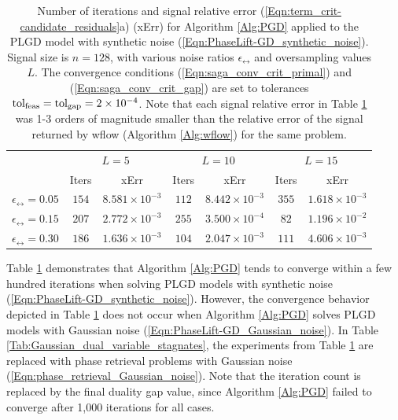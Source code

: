 \begin{table}[H]
\centering
\begin{tabular}{ |c|cc|cc|cc| }
 \hline

 	&	\multicolumn{2}{c|}{$L = 5$}
 		&	\multicolumn{2}{c|}{$L = 10$}
 			&	\multicolumn{2}{c|}{$L = 15$}	\\
 	&	 Iters	&	xErr
 		&	Iters	&	xErr
 			&	Iters	&	xErr		\\  			
 \hline
$\epsilon_\rel = 0.05$
	&	$154$ & $8.581 \times 10^{-3}$
		&	$112$ & $8.442 \times 10^{-3}$
			&	$355$ & $ 1.618 \times 10^{-3}$ \\
$\epsilon_\rel = 0.15$
	&	$207$ & $2.772 \times 10^{-3}$
		&	$255$ & $3.500 \times 10^{-4}$
			&	$82$ & $1.196 \times 10^{-2} $ \\
$\epsilon_\rel = 0.30$
	&	$186$ & $1.636 \times 10^{-3}$
		&	$104$ & $2.047 \times 10^{-3}$
			&	$111$ & $4.606 \times 10^{-3}$ \\
 \hline
\end{tabular}
\caption{Number of iterations and signal relative error (\ref{Eqn:term_crit-candidate_residuals}a) (xErr) for Algorithm \ref{Alg:PGD} applied to the PLGD model with synthetic noise (\ref{Eqn:PhaseLift-GD_synthetic_noise}).  Signal size is $n=128$, with various noise ratios $\epsilon_\rel$ and oversampling values $L$.  The convergence conditions (\ref{Eqn:saga_conv_crit_primal}) and (\ref{Eqn:saga_conv_crit_gap}) are set to tolerances $\textnormal{tol}_\textnormal{feas} = \textnormal{tol}_\textnormal{gap} = 2 \times 10^{-4}$.  Note that each signal relative error in Table \ref{Tab:synthetic_dual_variable_converges} was 1-3 orders of magnitude smaller than the relative error of the signal returned by wflow (Algorithm \ref{Alg:wflow}) for the same problem.} 
\label{Tab:synthetic_dual_variable_converges}
\end{table}


Table \ref{Tab:synthetic_dual_variable_converges} demonstrates that Algorithm \ref{Alg:PGD} tends to converge within a few hundred iterations when solving PLGD models with synthetic noise (\ref{Eqn:PhaseLift-GD_synthetic_noise}).  However, the convergence behavior depicted in Table \ref{Tab:synthetic_dual_variable_converges} does not occur when Algorithm \ref{Alg:PGD} solves PLGD models with Gaussian noise (\ref{Eqn:PhaseLift-GD_Gaussian_noise}).  In Table \ref{Tab:Gaussian_dual_variable_stagnates}, the experiments from Table \ref{Tab:synthetic_dual_variable_converges} are replaced with phase retrieval problems with Gaussian noise (\ref{Eqn:phase_retrieval_Gaussian_noise}).  Note that the iteration count is replaced by the final duality gap value, since Algorithm \ref{Alg:PGD} failed to converge after 1,000 iterations for all cases.


